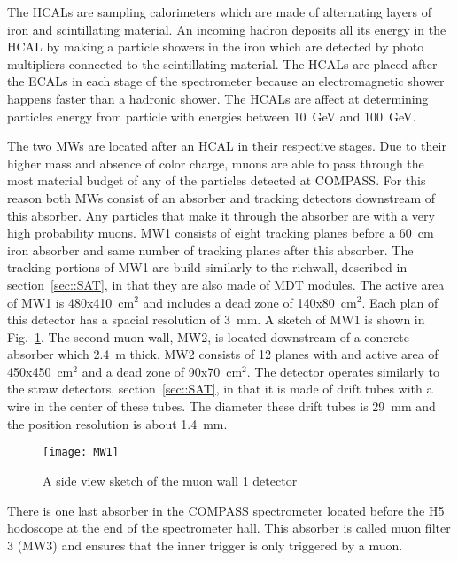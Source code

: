 The HCALs are sampling calorimeters which are made of alternating layers of iron
and scintillating material.  An incoming hadron deposits all its energy in the
HCAL by making a particle showers in the iron which are detected by photo
multipliers connected to the scintillating material.  The HCALs are placed after
the ECALs in each stage of the spectrometer because an electromagnetic shower
happens faster than a hadronic shower.  The HCALs are affect at determining
particles energy from particle with energies between 10~GeV and 100~GeV. \par

The two MWs are located after an HCAL in their respective stages.  Due to their
higher mass and absence of color charge, muons are able to pass through the most
material budget of any of the particles detected at COMPASS.  For this reason
both MWs consist of an absorber and tracking detectors downstream of this
absorber.  Any particles that make it through the absorber are with a very high
probability muons.  MW1 consists of eight tracking planes before a 60~cm iron
absorber and same number of tracking planes after this absorber.  The tracking
portions of MW1 are build similarly to the richwall, described in
section~\ref{sec::SAT}, in that they are also made of MDT modules.  The active
area of MW1 is 480x410~cm$^2$ and includes a dead zone of 140x80~cm$^2$.  Each
plan of this detector has a spacial resolution of 3~mm.  A sketch of MW1 is
shown in Fig.~\ref{fig::MW1}.  The second muon wall, MW2, is located downstream
of a concrete absorber which 2.4~m thick.  MW2 consists of 12 planes with and
active area of 450x450~cm$^2$ and a dead zone of 90x70~cm$^2$.  The detector
operates similarly to the straw detectors, section~\ref{sec::SAT}, in that it is
made of drift tubes with a wire in the center of these tubes.  The diameter
these drift tubes is 29~mm and the position resolution is about 1.4~mm. \par

\begin{figure}[h!t]
  \centering
  \texttt{[image: MW1]}
  \caption{A side view sketch of the muon wall 1 detector}
  \label{fig::MW1}
\end{figure}

There is one last absorber in the COMPASS spectrometer located before the H5
hodoscope at the end of the spectrometer hall.  This absorber is called muon
filter 3 (MW3) and ensures that the inner trigger is only triggered by a
muon. \par


